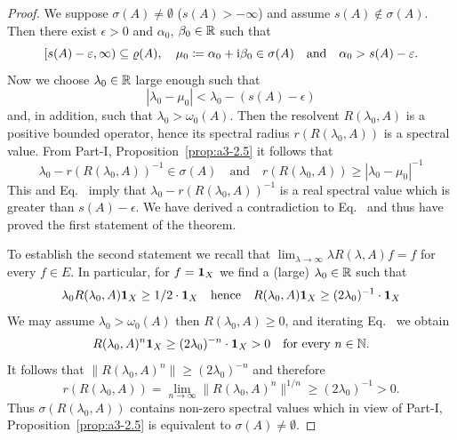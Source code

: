 \begin{proof}
	We suppose $\sigma(A) \neq \emptyset$ (\ie $s(A) > -\infty$) and assume $s(A) \notin \sigma(A)$.
	Then there exist $\epsilon > 0$ and $\alpha_{0}$, $\beta_{0} \in \mathbb{R}$ such that
	\begin{equation}\label{eq:b3-1.1}
		[s(A)-\epsilon,\infty) \subseteq \rho(A), \quad \mu_{0} \coloneq \alpha_{0} + \im\beta_{0} \in \sigma(A) \quad \text{and} \quad \alpha_{0} > s(A)-\epsilon.
	\end{equation}
	Now we choose $\lambda_{0} \in \mathbb{R}$ large enough such that
	\begin{equation}\label{eq:b3-1.2}
		|\lambda_{0} - \mu_{0}| < \lambda_{0} - (s(A) - \epsilon)
	\end{equation}
	and, in addition, such that $\lambda_{0} > \omega_{0}(A)$.
	Then the resolvent $R(\lambda_{0},A)$ is a positive bounded operator, hence its spectral radius $r(R(\lambda_{0},A))$ is a spectral value.
	From Part-I, Proposition~\ref{prop:a3-2.5} it follows that
	\begin{equation}\label{eq:b3-1.3}
		\lambda_{0} - r(R(\lambda_{0},A))^{-1} \in \sigma(A) \quad \text{and} \quad r(R(\lambda_{0},A)) \geq |\lambda_{0} - \mu_{0}|^{-1}
	\end{equation}
	This and Eq.~ imply that $\lambda_{0} - r(R(\lambda_{0},A))^{-1}$ is a real spectral value which is greater than $s(A) - \epsilon$.
	We have derived a contradiction to Eq.~ and thus have proved the first statement of the theorem.
	
	To establish the second statement we recall that $\lim_{\lambda \to \infty}\lambda R(\lambda,A)f = f$ for every $f \in E$.
	In particular, for $f = \mathbf{1}_{X}$ we find a (large) $\lambda_{0} \in \mathbb{R}$ such that
	\begin{equation}\label{eq:b3-1.4}
		\lambda_{0}R(\lambda_{0},A)\1_{X} \geq 1/2\cdot\1_{X} \quad \text{hence} \quad R(\lambda_{0},A)\1_{X} \geq (2\lambda_{0})^{-1}\cdot\1_{X}
	\end{equation}
	We may assume $\lambda_{0} > \omega_{0}(A)$ then $R(\lambda_{0},A) \geq 0$, and iterating Eq.~ we obtain
	\begin{equation}\label{eq:b3-1.5}
		R(\lambda_{0},A)^{n}\1_{X} \geq (2\lambda_{0})^{-n}\cdot\1_{X} > 0 \quad \text{for every } n \in \N.
	\end{equation}
	It follows that $\|R(\lambda_{0},A)^{n}\| \geq (2\lambda_{0})^{-n}$ and therefore
	\begin{equation}\label{eq:b3-1.6}
		r(R(\lambda_{0},A)) = \lim_{n \to \infty}\|R(\lambda_{0},A)^{n}\|^{1/n} \geq (2\lambda_{0})^{-1} > 0.
	\end{equation}
	Thus $\sigma(R(\lambda_{0},A))$ contains non-zero spectral values which in view of Part-I, Proposition~\ref{prop:a3-2.5} is equivalent to $\sigma(A) \neq \emptyset$.
\end{proof}
